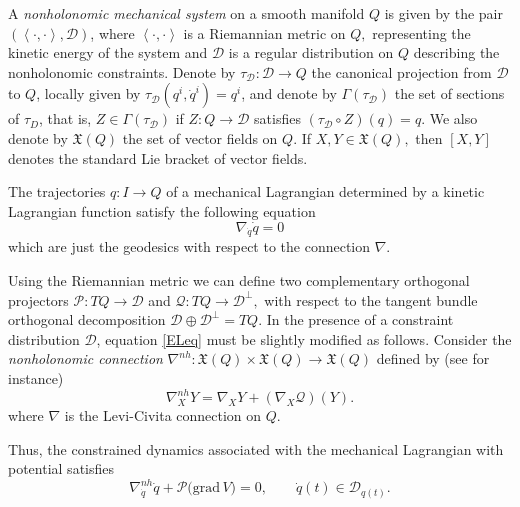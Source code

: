 \documentclass[letterpaper, 10 pt, conference]{ieeeconf}
\begin{document}
A \textit{nonholonomic mechanical system} on a smooth manifold $Q$ is given
by the pair $(\left< \cdot, \cdot\right>, \mathcal{D})$, where $\left< \cdot, \cdot\right>$ is
a Riemannian metric on $Q,$ representing the kinetic energy of the
system and $\mathcal{D}$ is a regular distribution on $Q$
describing the nonholonomic constraints. Denote by $\tau_{\mathcal{D}}:\mathcal{D}\rightarrow Q$ the canonical
projection from $\mathcal{D}$ to $Q$, locally given by $\tau_{\mathcal{D}}(q^i, \dot{q}^i)=q^i$, and denote by 
$\Gamma(\tau_{\mathcal{D}})$ the set of sections of $\tau_{D}$, that is, $Z\in\Gamma(\tau_{\mathcal{D}})$ if $Z:Q\to\mathcal{D}$ satisfies $(\tau_{\mathcal{D}}\circ Z)(q)=q$. We also denote by $\mathfrak{X}(Q)$ the set of vector fields on $Q$. If $X, Y\in\mathfrak{X}(Q),$ then
$[X,Y]$ denotes the standard Lie bracket of vector fields.


The trajectories $q:I\rightarrow Q$ of a mechanical Lagrangian determined by a kinetic Lagrangian function satisfy the following equation
\begin{equation}\label{ELeq}
    \nabla_{\dot{q}}\dot{q}= 0
\end{equation} which are just the geodesics with respect to the connection $\nabla$. %

Using the Riemannian metric we can define two
complementary orthogonal projectors ${\mathcal P}\colon TQ\to {\mathcal D}$ and ${\mathcal Q}\colon TQ\to {\mathcal
D}^{\perp},$ with respect to the tangent bundle orthogonal decomposition $\mathcal{D}\oplus\mathcal{D}^{\perp}=TQ$. In the presence of a constraint distribution $\mathcal{D}$, equation \eqref{ELeq} must be slightly modified as follows. Consider the \textit{nonholonomic connection} $\nabla^{nh}:\mathfrak{X}(Q)\times \mathfrak{X}(Q) \rightarrow \mathfrak{X}(Q)$ defined by (see \cite{bullo} for instance)
\begin{equation}\label{nh:connection}
    \nabla^{nh}_X Y =\nabla_{X} Y + (\nabla_{X} \mathcal{Q})(Y).
\end{equation} where $\nabla$  is the Levi-Civita connection on $Q$. 


Thus, the constrained dynamics associated with the mechanical Lagrangian with potential 
satisfies
\begin{equation}\label{nonholonomic:mechanical:equation}
    \nabla^{nh}_{\dot q}\dot q + \mathcal{P}\big(\mathrm{grad}\,V\big) = 0,
\qquad \dot q(t)\in\mathcal{D}_{q(t)}.
\end{equation}
\end{document}
